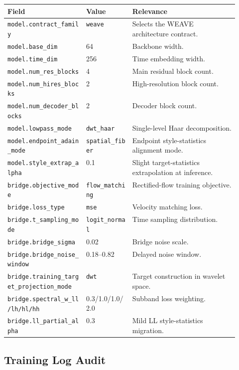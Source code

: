 \documentclass[10pt,twocolumn]{article}
\begin{document}
\begin{center}
\footnotesize
\begin{tabularx}{\linewidth}{p{0.34\linewidth}p{0.20\linewidth}X}
\toprule
Field & Value & Relevance \\
\midrule
\texttt{model.contract\_family} & \texttt{weave} & Selects the WEAVE architecture contract. \\
\texttt{model.base\_dim} & 64 & Backbone width. \\
\texttt{model.time\_dim} & 256 & Time embedding width. \\
\texttt{model.num\_res\_blocks} & 4 & Main residual block count. \\
\texttt{model.num\_hires\_blocks} & 2 & High-resolution block count. \\
\texttt{model.num\_decoder\_blocks} & 2 & Decoder block count. \\
\texttt{model.lowpass\_mode} & \texttt{dwt\_haar} & Single-level Haar decomposition. \\
\texttt{model.endpoint\_adain\_mode} & \texttt{spatial\_fiber} & Endpoint style-statistics alignment mode. \\
\texttt{model.style\_extrap\_alpha} & 0.1 & Slight target-statistics extrapolation at inference. \\
\texttt{bridge.objective\_mode} & \texttt{flow\_matching} & Rectified-flow training objective. \\
\texttt{bridge.loss\_type} & \texttt{mse} & Velocity matching loss. \\
\texttt{bridge.t\_sampling\_mode} & \texttt{logit\_normal} & Time sampling distribution. \\
\texttt{bridge.bridge\_sigma} & 0.02 & Bridge noise scale. \\
\texttt{bridge.bridge\_noise\_window} & 0.18--0.82 & Delayed noise window. \\
\texttt{bridge.training\_target\_projection\_mode} & \texttt{dwt} & Target construction in wavelet space. \\
\texttt{bridge.spectral\_w\_ll/lh/hl/hh} & 0.3/1.0/1.0/2.0 & Subband loss weighting. \\
\texttt{bridge.ll\_partial\_alpha} & 0.3 & Mild LL style-statistics migration. \\
\bottomrule
\end{tabularx}
\normalsize
\end{center}

\subsection{Training Log Audit}
\end{document}
